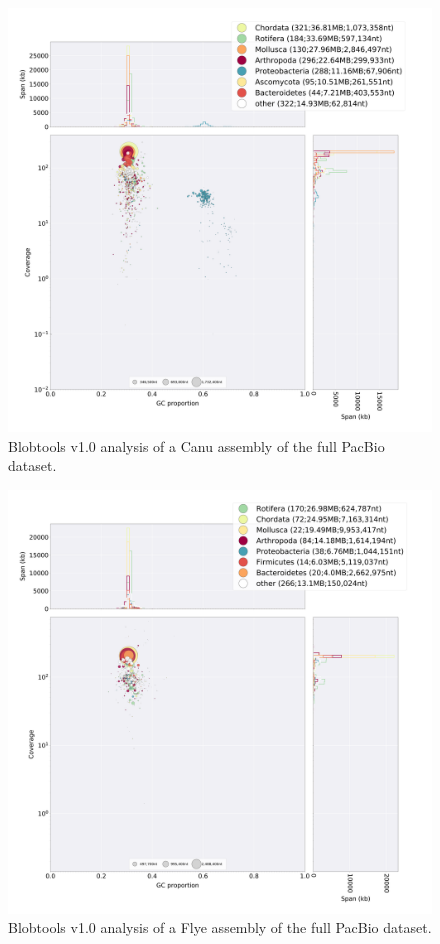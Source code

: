   \begin{figure}[ht]
    \centering
     \includegraphics[width=15cm]{fig/benchmark/PB_CANU.png}
   \caption{Blobtools v1.0 analysis of a Canu assembly of the full PacBio dataset.}
   \label{fig:blobtools_canu_pb}
 \end{figure}
 
 \begin{figure}[ht]
    \centering
     \includegraphics[width=15cm]{fig/benchmark/PB_FLYE.png}
   \caption{Blobtools v1.0 analysis of a Flye assembly of the full PacBio dataset.}
   \label{fig:blobtools_flye_pb}
 \end{figure}
 
